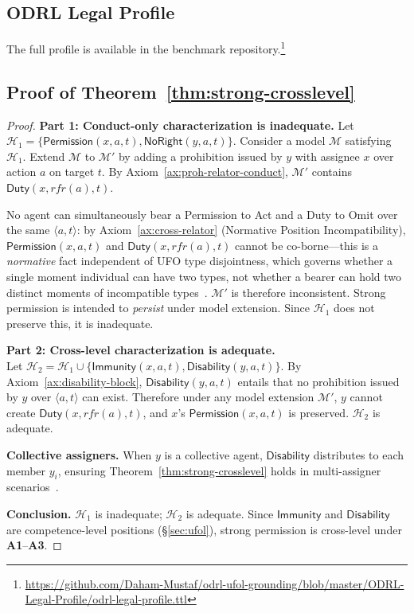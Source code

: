 \documentclass{IOS-Book-Article}
\newcommand{\PermPos}{\mathsf{Permission}}   %
\newcommand{\Duty}{\mathsf{Duty}}            %
\newcommand{\NoRight}{\mathsf{NoRight}}      %
\newcommand{\Disability}{\mathsf{Disability}} %
\newcommand{\Immunity}{\mathsf{Immunity}}
\theoremstyle{definition}
\begin{document}
\subsection*{ODRL Legal Profile}
\label{app:profile}
\noindent The full profile is available in the benchmark
repository.\footnote{\url{https://github.com/Daham-Mustaf/odrl-ufol-grounding/blob/master/ODRL-Legal-Profile/odrl-legal-profile.ttl}}
\subsection*{Proof of Theorem~\ref{thm:strong-crosslevel}}
\label{app:proof:strong}
\begin{proof}
\textbf{Part 1: Conduct-only characterization is inadequate.}
Let\\ $\mathcal{H}_1=\{\PermPos(x,a,t),\NoRight(y,a,t)\}$.
Consider a model $\mathcal{M}$ satisfying $\mathcal{H}_1$.
Extend $\mathcal{M}$ to $\mathcal{M}'$ by adding a prohibition
issued by $y$ with assignee $x$ over action $a$ on target $t$.
By Axiom~\ref{ax:proh-relator-conduct}, $\mathcal{M}'$
contains $\Duty(x,\mathit{rfr}(a),t)$.

No agent can simultaneously bear a Permission to Act and a
Duty to Omit over the same $\langle a,t\rangle$: by
Axiom~\ref{ax:cross-relator} (Normative Position
Incompatibility), $\PermPos(x,a,t)$ and
$\Duty(x,\mathit{rfr}(a),t)$ cannot be co-borne---this is
a \emph{normative} fact independent of UFO type disjointness,
which governs whether a single moment individual can have two
types, not whether a bearer can hold two distinct moments of
incompatible types~\cite{griffo2023powers}. $\mathcal{M}'$
is therefore inconsistent. Strong permission is intended to
\emph{persist} under model extension. Since $\mathcal{H}_1$
does not preserve this, it is inadequate.

\medskip\noindent\textbf{Part 2: Cross-level characterization
is adequate.}
\\
Let $\mathcal{H}_2=\mathcal{H}_1\cup\{\Immunity(x,a,t),
\Disability(y,a,t)\}$. By Axiom~\ref{ax:disability-block},
$\Disability(y,a,t)$ entails that no prohibition issued by
$y$ over $\langle a,t\rangle$ can exist. Therefore under any
model extension $\mathcal{M}'$, $y$ cannot create
$\Duty(x,\mathit{rfr}(a),t)$, and $x$'s $\PermPos(x,a,t)$
is preserved. $\mathcal{H}_2$ is adequate.

\medskip\noindent\textbf{Collective assigners.}
When $y$ is a collective agent, $\Disability$ distributes
to each member $y_i$, ensuring
Theorem~\ref{thm:strong-crosslevel} holds in multi-assigner
scenarios~\cite{griffo2023powers}.

\medskip\noindent\textbf{Conclusion.}
$\mathcal{H}_1$ is inadequate; $\mathcal{H}_2$ is adequate.
Since $\Immunity$ and $\Disability$ are competence-level
positions (\S\ref{sec:ufol}), strong permission is
cross-level under \textbf{A1}--\textbf{A3}.
\end{proof}
\end{document}
